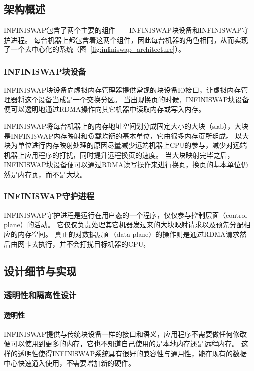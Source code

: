 \subsection{架构概述}
INFINISWAP包含了两个主要的组件——INFINISWAP块设备和INFINISWAP守护进程。
每台机器上都包含着这两个组件，因此每台机器的角色相同，从而实现了一个去中心化的系统（图~\ref{fig:infiniswap_architecture}）。

\subsubsection{INFINISWAP块设备}
INFINISWAP块设备向虚拟内存管理器提供常规的块设备IO接口，让虚拟内存管理器将这个设备当成是一个交换分区。
当出现换页的时候，INFINISWAP块设备便可以透明地通过RDMA操作向其它机器中读取内存或写入内存。

INFINISWAP将每台机器上的内存地址空间划分成固定大小的大块（slab），大块是INFINISWAP内存映射和负载均衡的基本单位，它由很多内存页所组成。
以大块为单位进行内存映射处理的原因尽量减少远端机器上CPU的参与，减少对远端机器上应用程序的打扰，同时提升远程换页的速度。
当大块映射完毕之后，INFINISWAP块设备便可以通过RDMA读写操作来进行换页，换页的基本单位仍然是内存页，而不是大块。

\subsubsection{INFINISWAP守护进程}
INFINISWAP守护进程是运行在用户态的一个程序，仅仅参与控制层面（control plane）的活动。
它仅仅负责处理其它机器发过来的大块映射请求以及预先分配相应的内存空间。
真正的对数据层面（data plane）的操作则是通过RDMA请求然后由网卡去执行，并不会打扰目标机器的CPU。

\subsection{设计细节与实现}

\subsubsection{透明性和隔离性设计}
\paragraph{透明性}
INFINISWAP提供与传统块设备一样的接口和语义，应用程序不需要做任何修改便可以使用到更多的内存，它也不知道自己使用的是本地内存还是远程内存。
这样的透明性使得INFINISWAP系统具有很好的兼容性与通用性，能在现有的数据中心快速通入使用，不需要增加新的硬件。

